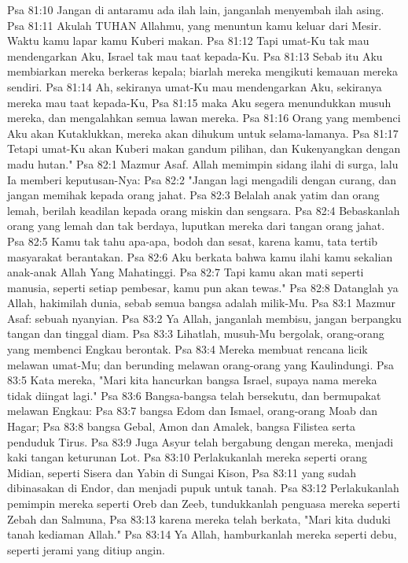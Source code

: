 Psa 81:10  Jangan di antaramu ada ilah lain, janganlah menyembah ilah asing.
Psa 81:11  Akulah TUHAN Allahmu, yang menuntun kamu keluar dari Mesir. Waktu kamu lapar kamu Kuberi makan.
Psa 81:12  Tapi umat-Ku tak mau mendengarkan Aku, Israel tak mau taat kepada-Ku.
Psa 81:13  Sebab itu Aku membiarkan mereka berkeras kepala; biarlah mereka mengikuti kemauan mereka sendiri.
Psa 81:14  Ah, sekiranya umat-Ku mau mendengarkan Aku, sekiranya mereka mau taat kepada-Ku,
Psa 81:15  maka Aku segera menundukkan musuh mereka, dan mengalahkan semua lawan mereka.
Psa 81:16  Orang yang membenci Aku akan Kutaklukkan, mereka akan dihukum untuk selama-lamanya.
Psa 81:17  Tetapi umat-Ku akan Kuberi makan gandum pilihan, dan Kukenyangkan dengan madu hutan."
Psa 82:1  Mazmur Asaf. Allah memimpin sidang ilahi di surga, lalu Ia memberi keputusan-Nya:
Psa 82:2  "Jangan lagi mengadili dengan curang, dan jangan memihak kepada orang jahat.
Psa 82:3  Belalah anak yatim dan orang lemah, berilah keadilan kepada orang miskin dan sengsara.
Psa 82:4  Bebaskanlah orang yang lemah dan tak berdaya, luputkan mereka dari tangan orang jahat.
Psa 82:5  Kamu tak tahu apa-apa, bodoh dan sesat, karena kamu, tata tertib masyarakat berantakan.
Psa 82:6  Aku berkata bahwa kamu ilahi kamu sekalian anak-anak Allah Yang Mahatinggi.
Psa 82:7  Tapi kamu akan mati seperti manusia, seperti setiap pembesar, kamu pun akan tewas."
Psa 82:8  Datanglah ya Allah, hakimilah dunia, sebab semua bangsa adalah milik-Mu.
Psa 83:1  Mazmur Asaf: sebuah nyanyian.
Psa 83:2  Ya Allah, janganlah membisu, jangan berpangku tangan dan tinggal diam.
Psa 83:3  Lihatlah, musuh-Mu bergolak, orang-orang yang membenci Engkau berontak.
Psa 83:4  Mereka membuat rencana licik melawan umat-Mu; dan berunding melawan orang-orang yang Kaulindungi.
Psa 83:5  Kata mereka, "Mari kita hancurkan bangsa Israel, supaya nama mereka tidak diingat lagi."
Psa 83:6  Bangsa-bangsa telah bersekutu, dan bermupakat melawan Engkau:
Psa 83:7  bangsa Edom dan Ismael, orang-orang Moab dan Hagar;
Psa 83:8  bangsa Gebal, Amon dan Amalek, bangsa Filistea serta penduduk Tirus.
Psa 83:9  Juga Asyur telah bergabung dengan mereka, menjadi kaki tangan keturunan Lot.
Psa 83:10  Perlakukanlah mereka seperti orang Midian, seperti Sisera dan Yabin di Sungai Kison,
Psa 83:11  yang sudah dibinasakan di Endor, dan menjadi pupuk untuk tanah.
Psa 83:12  Perlakukanlah pemimpin mereka seperti Oreb dan Zeeb, tundukkanlah penguasa mereka seperti Zebah dan Salmuna,
Psa 83:13  karena mereka telah berkata, "Mari kita duduki tanah kediaman Allah."
Psa 83:14  Ya Allah, hamburkanlah mereka seperti debu, seperti jerami yang ditiup angin.
